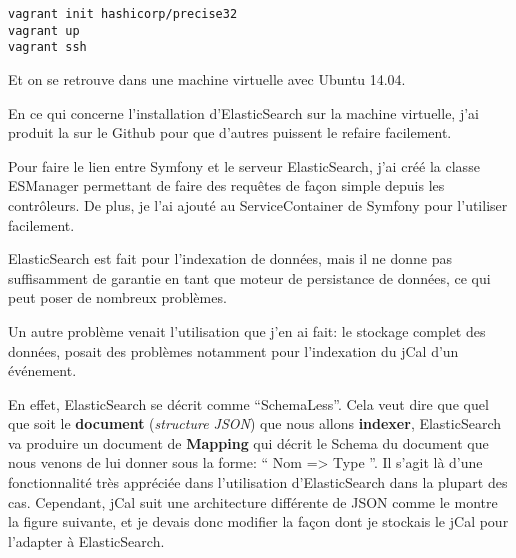 \begin{lstlisting}
vagrant init hashicorp/precise32
vagrant up
vagrant ssh
\end{lstlisting}

Et on se retrouve dans une machine virtuelle avec Ubuntu 14.04.

En ce qui concerne l'installation d'ElasticSearch sur la machine virtuelle, j'ai produit la  sur le Github pour que d'autres puissent le refaire facilement.

Pour faire le lien entre Symfony et le serveur ElasticSearch, j'ai créé la classe ESManager permettant de faire des requêtes de façon simple depuis les contrôleurs. De plus, je l'ai ajouté au ServiceContainer de Symfony pour l'utiliser facilement.

ElasticSearch est fait pour l'indexation de données, mais il ne donne pas suffisamment de garantie en tant que moteur de persistance de données, ce qui peut poser de nombreux problèmes.

Un autre problème venait l'utilisation que j'en ai fait: le stockage complet des données, posait des problèmes notamment pour l'indexation du jCal d'un événement.

En effet, ElasticSearch se décrit comme ``SchemaLess''. Cela veut dire que quel que soit le \textbf{document} (\textit{structure JSON}) que nous allons \textbf{indexer}, ElasticSearch va produire un document de \textbf{Mapping} qui décrit le Schema du document que nous venons de lui donner sous la forme: `` Nom => Type ''. Il s'agit là d'une fonctionnalité très appréciée dans l'utilisation d'ElasticSearch dans la plupart des cas. Cependant, jCal suit une architecture différente de JSON comme le montre la figure suivante, et je devais donc modifier la façon dont je stockais le jCal pour l'adapter à ElasticSearch.

